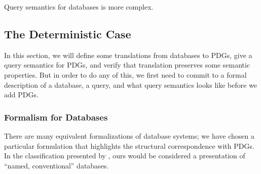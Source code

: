 \documentclass[the-pdg-manual.tex]{subfiles}
\begin{document}
	Query semantics for databases is more complex.

	\subsection{The Deterministic Case}

	In this section, we will define some translations from databases to PDGs,
	give a query semantics for PDGs, and verify that translation preserves some semantic properties.
	But in order to do any of this, we first need to commit to a formal description of a database, a query, and what query semantics looks like before we add PDGs.
	\subsubsection{Formalism for Databases}
	There are many equivalent formalizations of database systems; we have chosen a
	particular formulation that highlights the structural correspondence with PDGs.
	In the classification presented by \cite[\S3.3]{abiteboul1995foundations}, ours
	would be considered a presentation of ``named, conventional'' databases.
\end{document}
